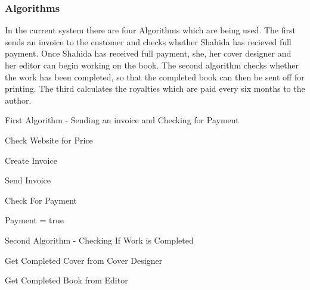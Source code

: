 \subsubsection{Algorithms}
In the current system there are four Algorithms which are being used. The first sends an invoice to the customer and checks whether Shahida has recieved full payment. Once Shahida has received full payment, she, her cover designer and her editor can begin working on the book. The second algorithm checks whether the work has been completed, so that the completed book can then be sent off for printing. The third calculates the royalties which are paid every six months to the author.

\begin{algorithm}[H]
    \caption{First Algorithm - Sending an invoice and Checking for Payment}
\begin{algorithmic}[1]
\State


    Check Website for Price

    Create Invoice

    Send Invoice


\EndWhile


     Check For Payment


     	Payment = true

     \EndIf
\EndWhile
\end{algorithmic}
\end{algorithm}


\begin{algorithm}[H]
    \caption{Second Algorithm - Checking If Work is Completed}
\begin{algorithmic}[1]
\State

    
    Get Completed Cover from Cover Designer


    Get Completed Book from Editor




    \EndIf
\EndWhile
\end{algorithmic}
\end{algorithm}

